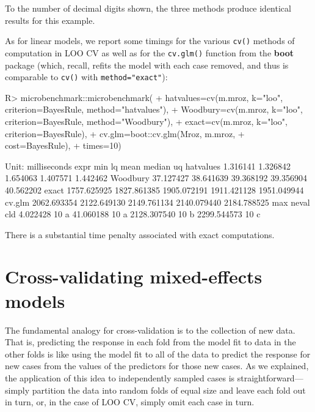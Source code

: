 \documentclass[
]{jss}
\begin{document}
To the number of decimal digits shown, the three methods produce
identical results for this example.

As for linear models, we report some timings for the various
\texttt{cv()} methods of computation in LOO CV as well as for the
\texttt{cv.glm()} function from the \textbf{boot} package (which,
recall, refits the model with each case removed, and thus is comparable
to \texttt{cv()} with \texttt{method="exact"}):

\begin{CodeChunk}
\begin{CodeInput}
R> microbenchmark::microbenchmark(
+   hatvalues=cv(m.mroz, k="loo", criterion=BayesRule, method="hatvalues"),
+   Woodbury=cv(m.mroz, k="loo", criterion=BayesRule, method="Woodbury"),
+   exact=cv(m.mroz, k="loo", criterion=BayesRule),
+   cv.glm=boot::cv.glm(Mroz, m.mroz,
+                cost=BayesRule),
+   times=10)
\end{CodeInput}
\begin{CodeOutput}
Unit: milliseconds
      expr         min          lq        mean      median          uq
 hatvalues    1.316141    1.326842    1.654063    1.407571    1.442462
  Woodbury   37.127427   38.641639   39.368192   39.356904   40.562202
     exact 1757.625925 1827.861385 1905.072191 1911.421128 1951.049944
    cv.glm 2062.693354 2122.649130 2149.761134 2140.079440 2184.788525
         max neval cld
    4.022428    10 a  
   41.060188    10 a  
 2128.307540    10  b 
 2299.544573    10   c
\end{CodeOutput}
\end{CodeChunk}

There is a substantial time penalty associated with exact computations.

\hypertarget{cross-validating-mixed-effects-models}{%
\section{Cross-validating mixed-effects
models}\label{cross-validating-mixed-effects-models}}

The fundamental analogy for cross-validation is to the collection of new
data. That is, predicting the response in each fold from the model fit
to data in the other folds is like using the model fit to all of the
data to predict the response for new cases from the values of the
predictors for those new cases. As we explained, the application of this
idea to independently sampled cases is straightforward---simply
partition the data into random folds of equal size and leave each fold
out in turn, or, in the case of LOO CV, simply omit each case in turn.
\end{document}
